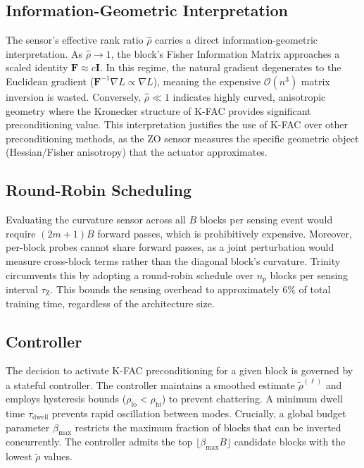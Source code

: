 \documentclass[conference]{IEEEtran}
\begin{document}
\subsection{Information-Geometric Interpretation}
\label{subsec:info_geom}
The sensor's effective rank ratio $\hat{\rho}$ carries a direct information-geometric interpretation. As $\hat{\rho} \to 1$, the block's Fisher Information Matrix approaches a scaled identity $\mathbf{F} \approx c\mathbf{I}$. In this regime, the natural gradient degenerates to the Euclidean gradient ($\mathbf{F}^{-1}\nabla L \propto \nabla L$), meaning the expensive $\mathcal{O}(n^3)$ matrix inversion is wasted. Conversely, $\hat{\rho} \ll 1$ indicates highly curved, anisotropic geometry where the Kronecker structure of K-FAC provides significant preconditioning value. This interpretation justifies the use of K-FAC over other preconditioning methods, as the ZO sensor measures the specific geometric object (Hessian/Fisher anisotropy) that the actuator approximates.

\subsection{Round-Robin Scheduling}
\label{subsec:round_robin}
Evaluating the curvature sensor across all $B$ blocks per sensing event would require $(2m+1)B$ forward passes, which is prohibitively expensive. Moreover, per-block probes cannot share forward passes, as a joint perturbation would measure cross-block terms rather than the diagonal block's curvature. Trinity circumvents this by adopting a round-robin schedule over $n_p$ blocks per sensing interval $\tau_{\mathrm{Z}}$. This bounds the sensing overhead to approximately 6\% of total training time, regardless of the architecture size.

\subsection{Controller}
\label{subsec:controller}
The decision to activate K-FAC preconditioning for a given block is governed by a stateful controller. The controller maintains a smoothed estimate $\tilde{\rho}^{(\ell)}$ and employs hysteresis bounds ($\rho_{\mathrm{lo}} < \rho_{\mathrm{hi}}$) to prevent chattering. A minimum dwell time $\tau_{\mathrm{dwell}}$ prevents rapid oscillation between modes. Crucially, a global budget parameter $\beta_{\mathrm{max}}$ restricts the maximum fraction of blocks that can be inverted concurrently. The controller admits the top $\lfloor \beta_{\mathrm{max}} B \rfloor$ candidate blocks with the lowest $\tilde{\rho}$ values. 
\end{document}
